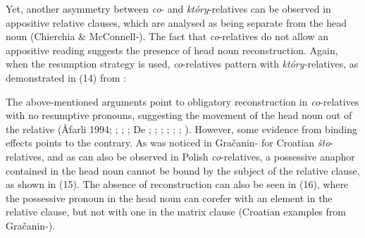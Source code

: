 \documentclass[output=paper]{langsci/langscibook}
\begin{document}
Yet, another asymmetry between \textit{co}{}- and \textit{który}{}-relatives can be observed in appositive relative clauses, which are analysed as being separate from the head noun (Chierchia \& McConnell-\citealt{Ginet1999}). The fact that \textit{co}{}-relatives do not allow an appositive reading suggests the presence of head noun reconstruction. Again, when the resumption strategy is used, \textit{co}{}-relatives pattern with \textit{który-}relatives, as demonstrated in (14) from \citet[378]{Szczegielniak2006}:

\ea%
    \label{ex:leska:14}
    \z
\z

The above-mentioned arguments point to obligatory reconstruction in \textit{co}{}-relatives with no resumptive pronouns, suggesting the movement of the head noun out of the relative (Åfarli 1994; \citealt{Bhatt2002}; \citealt{Bianchi1999}; \citealt{Brame1968}; De \citealt{Vries2002}; \citealt{Hornstein2000}; \citealt{Kayne1994}; \citealt{Safir1999}; \citealt{Schachter1973}; \citealt{Vergnaud1974}; \citealt{Zwart2000}). However, some evidence from binding effects points to the contrary. As was noticed in Gračanin-\citet{Yuksek2013} for Croatian \textit{što}{}-relatives, and as can also be observed in Polish \textit{co}{}-relatives, a possessive anaphor contained in the head noun cannot be bound by the subject of the relative clause, as shown in (15). The absence of reconstruction can also be seen in (16), where the possessive pronoun in the head noun can corefer with an element in the relative clause, but not with one in the matrix clause (Croatian examples from Gračanin-\citealt{Yuksek2013}).
\end{document}
